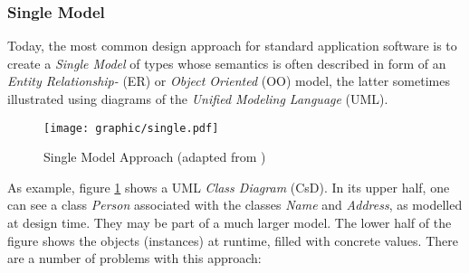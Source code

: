 %
%
%
%
%
%
%

\subsubsection{Single Model}
\label{single_model_heading}

Today, the most common design approach for standard application software is to
create a \emph{Single Model} of types whose semantics is often described in
form of an \emph{Entity Relationship-} (ER) or \emph{Object Oriented} (OO)
model,
the latter sometimes illustrated
using diagrams of the \emph{Unified Modeling Language} (UML).

\begin{figure}[ht]
    \begin{center}
        \texttt{[image: graphic/single.pdf]}
        \caption{Single Model Approach (adapted from \cite{archetypes})}
        \label{single_figure}
    \end{center}
\end{figure}

As example, figure \ref{single_figure} shows a UML \emph{Class Diagram} (CsD).
In its upper half, one can see a class \emph{Person} associated with the
classes \emph{Name} and \emph{Address}, as modelled at design time. They may be
part of a much larger model. The lower half of the figure shows the objects
(instances) at runtime, filled with concrete values. There are a number of
problems with this approach:







